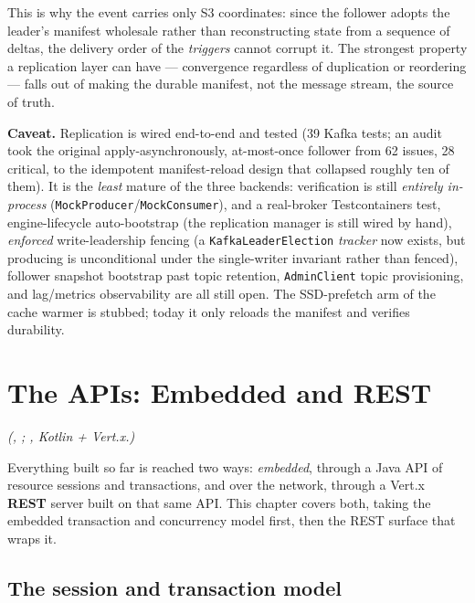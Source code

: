 \documentclass[11pt,a4paper,oneside]{report}
\theoremstyle{sirixthm}
\newcommand{\code}[1]{\texttt{#1}}
\begin{document}
\noindent This is why the event carries only S3 coordinates: since the follower adopts the leader's
manifest wholesale rather than reconstructing state from a sequence of deltas, the delivery order of the
\emph{triggers} cannot corrupt it. The strongest property a replication layer can have --- convergence
regardless of duplication or reordering --- falls out of making the durable manifest, not the message
stream, the source of truth.

\begin{honesty}
\small\textbf{Caveat.} Replication is wired end-to-end and tested (39 Kafka tests; an audit took
the original apply-asynchronously, at-most-once follower from 62 issues, 28 critical, to the idempotent
manifest-reload design that collapsed roughly ten of them). It is the \emph{least} mature of the three
backends: verification is still \emph{entirely in-process} (\code{MockProducer}/\allowbreak\code{MockConsumer}),
and a real-broker Testcontainers test, engine-lifecycle auto-bootstrap (the replication manager is still
wired by hand), \emph{enforced} write-leadership fencing (a \code{KafkaLeaderElection} \emph{tracker}
now exists, but producing is unconditional under the single-writer invariant rather than fenced),
follower snapshot bootstrap past topic retention, \code{AdminClient} topic provisioning, and lag/metrics
observability are all still open. The SSD-prefetch arm of the cache warmer is stubbed; today it only
reloads the manifest and verifies durability.
\end{honesty}

\chapter{The APIs: Embedded and REST}
\label{ch:rest}

\noindent\textit{(, ; , Kotlin {+} Vert.x.)}

Everything built so far is reached two ways: \emph{embedded}, through a Java API of resource sessions
and transactions, and over the network, through a Vert.x \textbf{REST} server built on that same API.
This chapter covers both, taking the embedded transaction and concurrency model first, then the REST
surface that wraps it.

\section{The session and transaction model}
\end{document}

